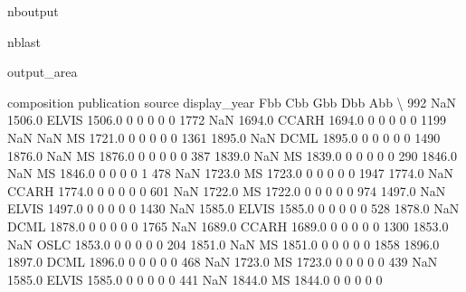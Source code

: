 \documentclass[letterpaper,10pt,english]{sphinxmanual}
\begin{document}
\begin{sphinxuseclass}{nboutput}
\begin{sphinxuseclass}{nblast}
{\begin{sphinxuseclass}{output_area}
\begin{sphinxuseclass}{}
\begin{sphinxVerbatim}[commandchars=\\\{\}]
      composition  publication source  display\_year  Fbb  Cbb  Gbb  Dbb  Abb  \textbackslash{}
992           NaN       1506.0  ELVIS        1506.0    0    0    0    0    0
1772          NaN       1694.0  CCARH        1694.0    0    0    0    0    0
1199          NaN          NaN     MS        1721.0    0    0    0    0    0
1361       1895.0          NaN   DCML        1895.0    0    0    0    0    0
1490       1876.0          NaN     MS        1876.0    0    0    0    0    0
387        1839.0          NaN     MS        1839.0    0    0    0    0    0
290        1846.0          NaN     MS        1846.0    0    0    0    0    1
478           NaN       1723.0     MS        1723.0    0    0    0    0    0
1947       1774.0          NaN  CCARH        1774.0    0    0    0    0    0
601           NaN       1722.0     MS        1722.0    0    0    0    0    0
974        1497.0          NaN  ELVIS        1497.0    0    0    0    0    0
1430          NaN       1585.0  ELVIS        1585.0    0    0    0    0    0
528        1878.0          NaN   DCML        1878.0    0    0    0    0    0
1765          NaN       1689.0  CCARH        1689.0    0    0    0    0    0
1300       1853.0          NaN   OSLC        1853.0    0    0    0    0    0
204        1851.0          NaN     MS        1851.0    0    0    0    0    0
1858       1896.0       1897.0   DCML        1896.0    0    0    0    0    0
468           NaN       1723.0     MS        1723.0    0    0    0    0    0
439           NaN       1585.0  ELVIS        1585.0    0    0    0    0    0
441           NaN       1844.0     MS        1844.0    0    0    0    0    0


\end{sphinxVerbatim}
\end{sphinxuseclass}
\end{sphinxuseclass}}
\end{sphinxuseclass}
\end{sphinxuseclass}
\end{document}
